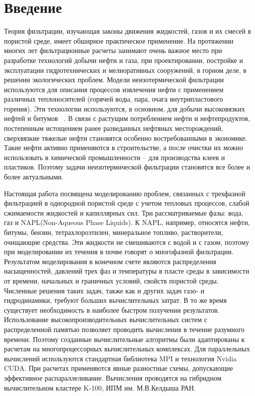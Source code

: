 \section{Введение}
Теория фильтрации, изучающая законы движения жидкостей, газов и их смесей в
пористой среде, имеет обширное практическое применение. На протяжении многих лет
фильтрационные расчеты занимают очень важное место при разработке технологий
добычи нефти и газа, при проектировании, постройке и эксплуатации
гидротехнических  и мелиоративных сооружений, в горном деле, в решении
экологических проблем.  Модели неизотермической фильтрации используются для описания
процессов извлечения нефти
с применением различных теплоносителей (горячей воды, пара, очага внутрипластового
горения). Эти технологии используются, в основном, для добычи высоковязких нефтей и битумов ~\cite{Kanevskaya}.
В связи с растущим потреблением нефти и нефтепродуктов, постепенным истощением ранее разведанных
нефтяных месторождений, сверхвязкие тяжелые нефти становятся особенно востребованными в экономике. 
Такие нефти активно применяются в строительстве, а после очистки
их можно использовать в химической промышленности -- для производства клеев и пластиков.
Поэтому задачи неизотермической фильтрации
становятся все более и более актуальными.

Настоящая работа посвящена моделированию проблем, связанных с трехфазной фильтрацией 
в однородной пористой среде с учетом тепловых процессов, слабой сжимаемости жидкостей
и капиллярных сил.
Три рассматриваемые фазы: вода, газ и NAPL(Non-Aqueous Phase 
Liquids). К NAPL, например, относятся нефти, битумы, бензин, тетрахлороэтилен, 
минеральное топливо, растворители, очищающие средства. 
Эти жидкости не смешиваются с водой и с газом,
поэтому при моделировании их течения
в почве говорят о многофазной фильтрации.
Результатом моделирования в конечном счете являются распределения насыщенностей, давлений
трех фаз и температуры в пласте среды в зависимости от времени, начальных и граничных
условий, свойств пористой среды. 
Численные решения таких задач, также как и других задач газо- и гидродинамики,
требуют больших вычислительных затрат. В то же время существует необходимость в
наиболее быстром получении результатов. Использование
высокопроизводительных вычислительных систем с распределенной памятью
позволяет проводить вычисления в течение разумного времени. Поэтому созданные
вычислительные алгоритмы были адаптированы к расчетам на многопроцессорных
вычислительных комплексах. Для параллельных вычислений используются стандартная
библиотека MPI и технология Nvidia CUDA. При расчетах применяются явные разностные 
схемы, допускающие эффективное распараллеливание. Вычисления проводятся
на гибридном вычислительном кластере K-100, ИПМ им. М.В.Келдыша РАН.
